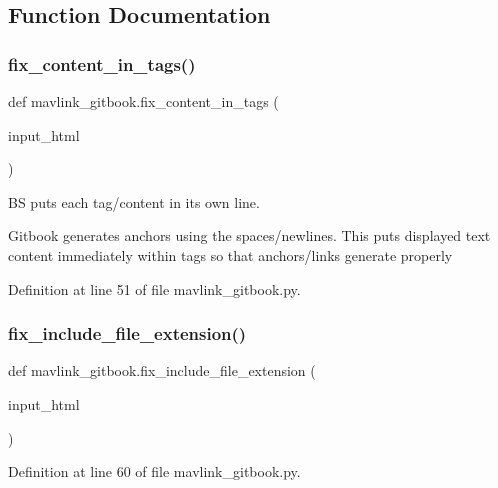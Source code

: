 \subsection{Function Documentation}
\mbox{\label{namespacemavlink__gitbook_a0401ef11ed769a42f321ee486f274039}} 
\subsubsection{\texorpdfstring{fix\_content\_in\_tags()}{fix\_content\_in\_tags()}}
{\footnotesize\ttfamily def mavlink\+\_\+gitbook.\+fix\+\_\+content\+\_\+in\+\_\+tags (\begin{DoxyParamCaption}\item[{}]{input\+\_\+html }\end{DoxyParamCaption})}



BS puts each tag/content in its own line. 

Gitbook generates anchors using the spaces/newlines. This puts displayed text content immediately within tags so that anchors/links generate properly 

Definition at line 51 of file mavlink\+\_\+gitbook.\+py.

\mbox{\label{namespacemavlink__gitbook_a9bc4614799f922b28688524e674ba96a}} 
\subsubsection{\texorpdfstring{fix\_include\_file\_extension()}{fix\_include\_file\_extension()}}
{\footnotesize\ttfamily def mavlink\+\_\+gitbook.\+fix\+\_\+include\+\_\+file\+\_\+extension (\begin{DoxyParamCaption}\item[{}]{input\+\_\+html }\end{DoxyParamCaption})}



Definition at line 60 of file mavlink\+\_\+gitbook.\+py.

